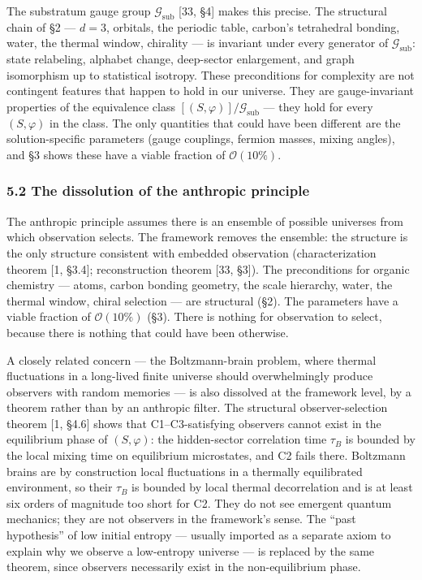 \documentclass[
]{article}
\begin{document}
The substratum gauge group \(\mathcal{G}_{\text{sub}}\) {[}33, §4{]}
makes this precise. The structural chain of §2 --- \(d = 3\), orbitals,
the periodic table, carbon's tetrahedral bonding, water, the thermal
window, chirality --- is invariant under every generator of
\(\mathcal{G}_{\text{sub}}\): state relabeling, alphabet change,
deep-sector enlargement, and graph isomorphism up to statistical
isotropy. These preconditions for complexity are not contingent features
that happen to hold in our universe. They are gauge-invariant properties
of the equivalence class \([(S, \varphi)]/\mathcal{G}_{\text{sub}}\) ---
they hold for every \((S, \varphi)\) in the class. The only quantities
that could have been different are the solution-specific parameters
(gauge couplings, fermion masses, mixing angles), and §3 shows these
have a viable fraction of \(\mathcal{O}(10\%)\).

\hypertarget{the-dissolution-of-the-anthropic-principle}{%
\subsubsection{5.2 The dissolution of the anthropic
principle}\label{the-dissolution-of-the-anthropic-principle}}

The anthropic principle assumes there is an ensemble of possible
universes from which observation selects. The framework removes the
ensemble: the structure is the only structure consistent with embedded
observation (characterization theorem {[}1, §3.4{]}; reconstruction
theorem {[}33, §3{]}). The preconditions for organic chemistry ---
atoms, carbon bonding geometry, the scale hierarchy, water, the thermal
window, chiral selection --- are structural (§2). The parameters have a
viable fraction of \(\mathcal{O}(10\%)\) (§3). There is nothing for
observation to select, because there is nothing that could have been
otherwise.

A closely related concern --- the Boltzmann-brain problem, where thermal
fluctuations in a long-lived finite universe should overwhelmingly
produce observers with random memories --- is also dissolved at the
framework level, by a theorem rather than by an anthropic filter. The
structural observer-selection theorem {[}1, §4.6{]} shows that
C1--C3-satisfying observers cannot exist in the equilibrium phase of
\((S, \varphi)\): the hidden-sector correlation time \(\tau_B\) is
bounded by the local mixing time on equilibrium microstates, and C2
fails there. Boltzmann brains are by construction local fluctuations in
a thermally equilibrated environment, so their \(\tau_B\) is bounded by
local thermal decorrelation and is at least six orders of magnitude too
short for C2. They do not see emergent quantum mechanics; they are not
observers in the framework's sense. The ``past hypothesis'' of low
initial entropy --- usually imported as a separate axiom to explain why
we observe a low-entropy universe --- is replaced by the same theorem,
since observers necessarily exist in the non-equilibrium phase.
\end{document}
